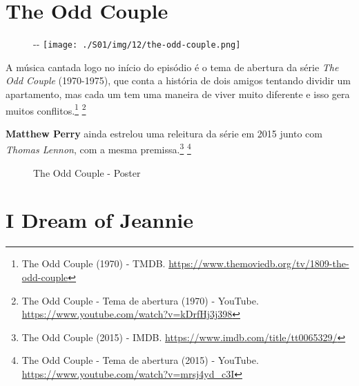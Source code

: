 \hypertarget{the-odd-couple}{%
\section{The Odd Couple}\label{the-odd-couple}}

\begin{figure}[!ht]
  \begin{adjustwidth}{-\oddsidemargin-1in}{-\rightmargin}
    \centering
    \texttt{[image: ./S01/img/12/the-odd-couple.png]}
  \end{adjustwidth}
\end{figure}

A música cantada logo no início do episódio é o tema de abertura da
série \emph{The Odd Couple} (1970-1975), que conta a história de dois
amigos tentando dividir um apartamento, mas cada um tem uma maneira de
viver muito diferente e isso gera muitos conflitos.\footnote{\sloppy The Odd Couple (1970) - TMDB. \url{https://www.themoviedb.org/tv/1809-the-odd-couple}}
\footnote{\sloppy The Odd Couple - Tema de abertura (1970) - YouTube. \url{https://www.youtube.com/watch?v=kDrfHj3j398}}

\textbf{Matthew Perry} ainda estrelou uma releitura da série em 2015
junto com \emph{Thomas Lennon}, com a mesma premissa.\footnote{\sloppy The Odd Couple (2015) - IMDB. \url{https://www.imdb.com/title/tt0065329/}}
\footnote{\sloppy The Odd Couple - Tema de abertura (2015) - YouTube. \url{https://www.youtube.com/watch?v=mrsj4yd_c3I}}

\begin{figure}
  \centering
    \caption{The Odd Couple - Poster\label{fig:the-odd-couple-poster}}
\end{figure}

\hypertarget{i-dream-of-jeannie}{%
\section{I Dream of Jeannie}\label{i-dream-of-jeannie}}

